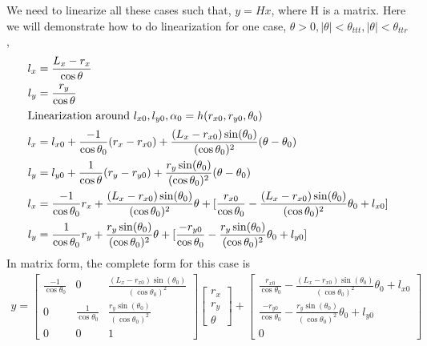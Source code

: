 \documentclass[12pt, letterpaper]{amsart} %
\numberwithin{equation}{section}
\begin{document}
\\
\\
We need to linearize all these cases such that, $y = H x$, where H is a matrix. Here we will demonstrate how to do linearization for one case, $\theta >0, |\theta| < \theta_{ttt}, |\theta| < \theta_{ttr}$,
\begin{align*}
  l_x &= \frac{L_x - r_x}{\cos \theta} \\
  l_y &= \frac{r_y}{\cos \theta} \\
  \intertext{Linearization around $l_{x0}, l_{y0}, \alpha_{0} = h(r_{x0}, r_{y0}, \theta_0)$}
  l_x &= l_{x0} + \frac{-1}{\cos \theta_0} (r_x - r_{x0}) + \frac{(L_x - r_{x0})\sin(\theta_0)}{(\cos{\theta_0})^2} (\theta - \theta_0) \\
  l_y &= l_{y0} + \frac{1}{\cos \theta}(r_y - r_{y0}) + \frac{r_y \sin(\theta_0)}{(\cos \theta_0)^2} (\theta - \theta_0) \\
  l_x &= \frac{-1}{\cos \theta_0} r_x + \frac{(L_x - r_{x0})\sin(\theta_0)}{(\cos{\theta_0})^2} \theta + [\frac{r_{x0}}{\cos \theta_0} - \frac{(L_x - r_{x0})\sin(\theta_0)}{(\cos{\theta_0})^2}\theta_0 + l_{x0}] \\
  l_y &= \frac{1}{\cos \theta_0}r_y + \frac{r_y \sin(\theta_0)}{(\cos \theta_0)^2} \theta + [\frac{-r_{y0}}{\cos \theta_0} - \frac{r_y \sin(\theta_0)}{(\cos \theta_0)^2} \theta_0 + l_{y0}]
\end{align*}
In matrix form, the complete form for this case is
\begin{align*}
  y =
  \begin{bmatrix}
    \frac{-1}{\cos \theta_0} & 0 & \frac{(L_x - r_{x0})\sin(\theta_0)}{(\cos{\theta_0})^2} \\
    0 & \frac{1}{\cos \theta_0} & \frac{r_y \sin(\theta_0)}{(\cos \theta_0)^2} \\
    0 & 0 & 1
  \end{bmatrix}
            \begin{bmatrix}
              r_x \\
              r_y \\
              \theta
            \end{bmatrix}
            +
            \begin{bmatrix}
              \frac{r_{x0}}{\cos \theta_0} - \frac{(L_x - r_{x0})\sin(\theta_0)}{(\cos{\theta_0})^2}\theta_0 + l_{x0} \\
              \frac{-r_{y0}}{\cos \theta_0} - \frac{r_y \sin(\theta_0)}{(\cos \theta_0)^2} \theta_0 + l_{y0} \\
              0
            \end{bmatrix}
\end{align*}
\end{document}
